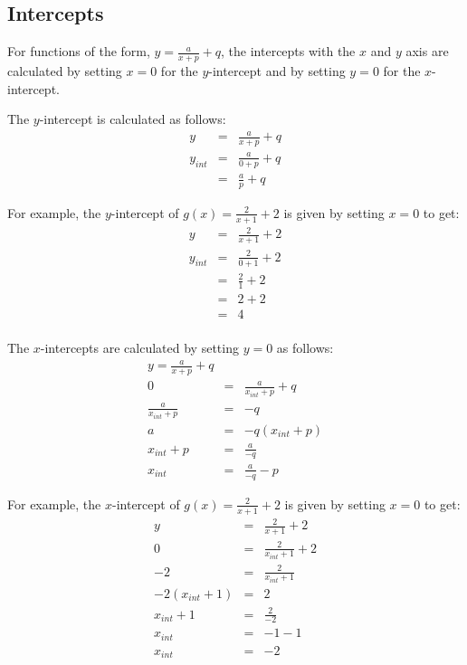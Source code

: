 \subsection{Intercepts}
For functions of the form, $y=\frac{a}{x+p} + q$, the intercepts with the $x$ and $y$ axis are calculated by setting $x=0$ for the $y$-intercept and by setting $y=0$ for the $x$-intercept.

The $y$-intercept is calculated as follows:
\begin{eqnarray}
y&=&\frac{a}{x+p} + q\\
y_{int}&=&\frac{a}{0+p} + q\\
&=&\frac{a}{p} + q
\end{eqnarray}

For example, the $y$-intercept of $g(x)=\frac{2}{x+1} + 2$ is given by setting $x=0$ to get:
\begin{eqnarray*}
y&=&\frac{2}{x+1} + 2\\
y_{int}&=&\frac{2}{0+1} + 2\\
&=&\frac{2}{1} + 2\\
&=&2+ 2\\
&=&4\\
\end{eqnarray*}

The $x$-intercepts are calculated by setting $y=0$ as follows:
\begin{eqnarray}
y=\frac{a}{x+p} + q\\
0&=&\frac{a}{x_{int}+p} + q\\
\frac{a}{x_{int}+p}&=&-q\\
a&=&-q(x_{int}+p)\\
x_{int}+p&=&\frac{a}{-q}\\
x_{int}&=&\frac{a}{-q}-p
\end{eqnarray}

For example, the $x$-intercept of $g(x)=\frac{2}{x+1} + 2$ is given by setting $x=0$ to get:
\begin{eqnarray*}
y&=&\frac{2}{x+1} + 2\\
0&=&\frac{2}{x_{int}+1} + 2\\
-2&=&\frac{2}{x_{int}+1}\\
-2(x_{int}+1)&=&2\\
x_{int}+1&=&\frac{2}{-2}\\
x_{int}&=&-1-1\\
x_{int}&=&-2
\end{eqnarray*}

